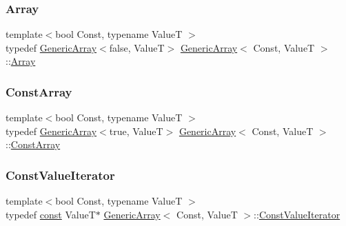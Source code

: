 \mbox{\label{classGenericArray_a6683902e86c051c2319e873537dca7b1}} 
\subsubsection{\texorpdfstring{Array}{Array}}
{\footnotesize\ttfamily template$<$bool Const, typename ValueT $>$ \\
typedef \hyperlink{classGenericArray}{Generic\+Array}$<$false, ValueT$>$ \hyperlink{classGenericArray}{Generic\+Array}$<$ Const, ValueT $>$\+::\hyperlink{classGenericArray_a6683902e86c051c2319e873537dca7b1}{Array}}

\mbox{\label{classGenericArray_a84f0b14518bc5cc44b4ff76a7d5ef81b}} 
\subsubsection{\texorpdfstring{Const\+Array}{ConstArray}}
{\footnotesize\ttfamily template$<$bool Const, typename ValueT $>$ \\
typedef \hyperlink{classGenericArray}{Generic\+Array}$<$true, ValueT$>$ \hyperlink{classGenericArray}{Generic\+Array}$<$ Const, ValueT $>$\+::\hyperlink{classGenericArray_a84f0b14518bc5cc44b4ff76a7d5ef81b}{Const\+Array}}

\mbox{\label{classGenericArray_a1cd7bb3e75ccfeed3e8b0a6bb5563d68}} 
\subsubsection{\texorpdfstring{Const\+Value\+Iterator}{ConstValueIterator}}
{\footnotesize\ttfamily template$<$bool Const, typename ValueT $>$ \\
typedef \hyperlink{classGenericArray_a25d2ed55daa117c41db6a5b3f87e9ddc}{const} ValueT$\ast$ \hyperlink{classGenericArray}{Generic\+Array}$<$ Const, ValueT $>$\+::\hyperlink{classGenericArray_a1cd7bb3e75ccfeed3e8b0a6bb5563d68}{Const\+Value\+Iterator}}

